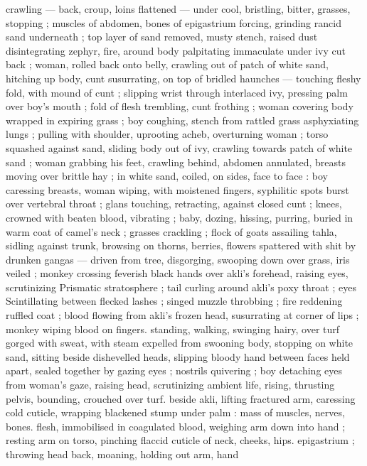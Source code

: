crawling --- back, croup, loins flattened --- under cool, bristling,
bitter, grasses, stopping ; muscles of abdomen, bones of
epigastrium forcing, grinding rancid sand underneath ; top layer of
sand removed, musty stench, raised dust disintegrating zephyr, fire,
around body palpitating immaculate under ivy cut back ; woman,
rolled back onto belly, crawling out of patch of white sand, hitching
up body, cunt susurrating, on top of bridled haunches --- touching
fleshy fold, with mound of cunt ; slipping wrist through interlaced ivy,
pressing palm over boy's mouth ; fold of flesh trembling, cunt
frothing ; woman covering body wrapped in expiring grass ; boy
coughing, stench from rattled grass asphyxiating lungs ; pulling with
shoulder, uprooting acheb, overturning woman ; torso squashed
against sand, sliding body out of ivy, crawling towards patch of white
sand ; woman grabbing his feet, crawling behind, abdomen
annulated, breasts moving over brittle hay ; in white sand, coiled, on
sides, face to face : boy caressing breasts, woman wiping, with
moistened fingers, syphilitic spots burst over vertebral throat ; glans
touching, retracting, against closed cunt ; knees, crowned with
beaten blood, vibrating ; baby, dozing, hissing, purring, buried in
warm coat of camel's neck ; grasses crackling ; flock of goats
assailing tahla, sidling against trunk, browsing on thorns, berries,
flowers spattered with shit by drunken gangas --- driven from tree,
disgorging, swooping down over grass, iris veiled ; monkey crossing
feverish black hands over akli’s forehead, raising eyes, scrutinizing
Prismatic stratosphere ; tail curling around akli's poxy throat ; eyes
Scintillating between flecked lashes ; singed muzzle throbbing ; fire
reddening ruffled coat ; blood flowing from akli’s frozen head,
susurrating at corner of lips ; monkey wiping blood on fingers.
standing, walking, swinging hairy, over turf gorged with sweat, with
steam expelled from swooning body, stopping on white sand, sitting
beside dishevelled heads, slipping bloody hand between faces held
apart, sealed together by gazing eyes ; nostrils quivering ; boy
detaching eyes from woman's gaze, raising head, scrutinizing
ambient life, rising, thrusting pelvis, bounding, crouched over turf.
beside akli, lifting fractured arm, caressing cold cuticle, wrapping
blackened stump under palm : mass of muscles, nerves, bones.
flesh, immobilised in coagulated blood, weighing arm down into hand
; resting arm on torso, pinching flaccid cuticle of neck, cheeks, hips.
epigastrium ; throwing head back, moaning, holding out arm, hand
